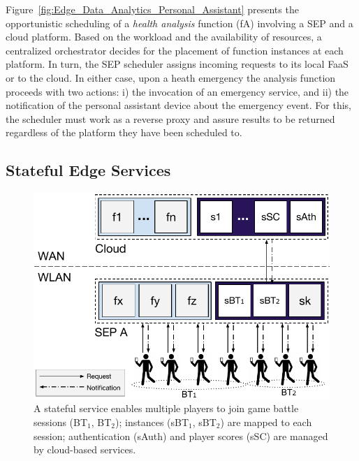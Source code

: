 \documentclass[letterpaper, 10 pt, conference]{ieeeconf}  %
\begin{document}
Figure~\ref{fig:Edge_Data_Analytics_Personal_Assistant} presents the opportunistic scheduling of a \textit{health analysis} function (fA) involving a SEP and a cloud platform. Based on the workload and the availability of resources, a centralized orchestrator decides for the placement of function instances at each platform. In turn, the SEP scheduler assigns incoming requests to its local FaaS or to the cloud. In either case, upon a heath emergency the analysis function proceeds with two actions: i) the invocation of an emergency service, and ii) the notification of the personal assistant device about the emergency event. For this, the scheduler must work as a reverse proxy and assure results to be returned regardless of the platform they have been scheduled to.




\subsection{Stateful Edge Services}

\begin{figure}[tbp]
	\centering
	\includegraphics[width=\linewidth]{Figs/Stateful_Edge_Services.pdf}
	\caption{A stateful service enables multiple players to join game battle sessions (BT$_1$, BT$_2$); instances (sBT$_1$, sBT$_2$) are mapped to each session; authentication (sAuth) and player scores (sSC) are managed by cloud-based services.}
	\label{fig:Steteful_Edge_MMG}
\end{figure}
\end{document}

